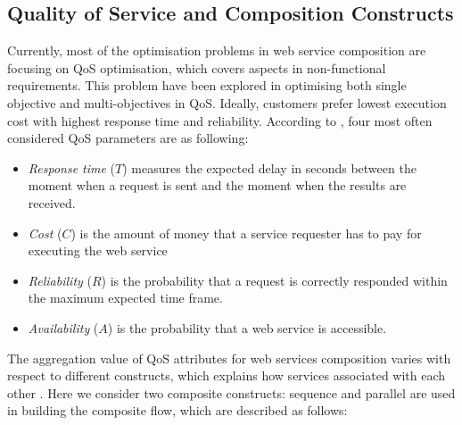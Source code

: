 \documentclass{llncs}
\begin{document}
\subsection{Quality of Service and Composition Constructs}\label{web service selection}
Currently, most of the optimisation problems \cite{feng2013dynamic,huang2009effective,ma2015hybrid,da2014graph} in web service composition are focusing on QoS optimisation, which covers aspects in non-functional requirements. This problem have been explored in optimising both single objective and multi-objectives in QoS. Ideally, customers prefer lowest execution cost with highest response time and reliability. According to \cite{zeng2003quality}, four most often considered QoS parameters are as following:
\begin{itemize}
\item \textit{Response time} ($T$) measures the expected delay in seconds between the moment when a request is sent and the moment when the results are received.
\item \textit{Cost} ($C$) is the amount of money that a service requester has to pay for executing the web service
\item \textit{Reliability} ($R$) is the probability that a request is correctly responded within the maximum expected time frame.
\item \textit{Availability} ($A$) is the probability that a web service is accessible.
\end{itemize}
The aggregation value of QoS attributes for web services composition varies with respect to different constructs, which explains how services associated with each other \cite{zeng2003quality}. Here we consider two composite constructs: sequence and parallel are used in building the composite flow, which are described as follows:
\end{document}
